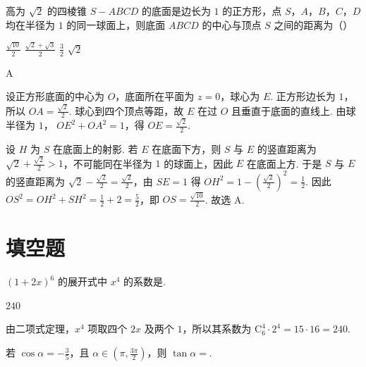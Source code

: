 \begin{problem}
高为 \(\sqrt{2}\) 的四棱锥 \(S - ABCD\) 的底面是边长为 \(1\) 的正方形，点 \(S\)，\(A\)，\(B\)，\(C\)，\(D\) 均在半径为 \(1\) 的同一球面上，则底面 \(ABCD\) 的中心与顶点 \(S\) 之间的距离为（\quad）

\choices
    {\(\frac{\sqrt{10}}{2}\)}
    {\(\frac{\sqrt{2} + \sqrt{3}}{2}\)}
    {\(\frac{3}{2}\)}
    {\(\sqrt{2}\)}
\end{problem}

\begin{answer}
    A
\end{answer}

\begin{solution}
设正方形底面的中心为 \(O\)，底面所在平面为 \(z=0\)，球心为 \(E\). 正方形边长为 \(1\)，所以 \(OA=\frac{\sqrt2}{2}\). 球心到四个顶点等距，故 \(E\) 在过 \(O\) 且垂直于底面的直线上. 由球半径为 \(1\)，
\(OE^{2}+OA^{2}=1\)，得 \(OE=\frac{\sqrt2}{2}\).

设 \(H\) 为 \(S\) 在底面上的射影. 若 \(E\) 在底面下方，则 \(S\) 与 \(E\) 的竖直距离为 \(\sqrt2+\frac{\sqrt2}{2}>1\)，不可能同在半径为 \(1\) 的球面上，因此 \(E\) 在底面上方. 于是 \(S\) 与 \(E\) 的竖直距离为 \(\sqrt2-\frac{\sqrt2}{2}=\frac{\sqrt2}{2}\)，由 \(SE=1\) 得
\(OH^{2}=1-\left(\frac{\sqrt2}{2}\right)^{2}=\frac12\). 因此
\(OS^{2}=OH^{2}+SH^{2}=\frac12+2=\frac52\)，即 \(OS=\frac{\sqrt{10}}2\). 故选 A.
\end{solution}

\section{填空题}

\begin{problem}
\(\left(1 + 2x\right)^{6}\) 的展开式中 \(x^{4}\) 的系数是\fillinblank{}.
\end{problem}

\begin{answer}
    \(240\)
\end{answer}

\begin{solution}
由二项式定理，\(x^{4}\) 项取四个 \(2x\) 及两个 \(1\)，所以其系数为
\(\mathrm C_{6}^{4}\cdot2^{4}=15\cdot16=240\).
\end{solution}

\begin{problem}
若 \(\cos \alpha = -\frac{3}{5}\)，且 \(\alpha \in \left(\pi, \frac{3\pi}{2}\right)\)，则 \(\tan \alpha =\)\fillinblank{}.
\end{problem}

